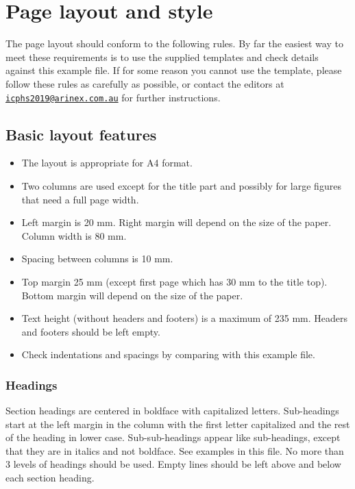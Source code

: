 \documentclass[a4paper,11pt,twocolumn]{article}
\begin{document}
\section{Page layout and style}

The page layout should conform to the following rules. By far the
easiest way to meet these requirements is to use the supplied templates
and check details against this example file. If for some reason you
cannot use the template, please follow these rules as carefully as
possible, or contact the editors at
\href{mailto:icphs2019@arinex.com.au}{\nolinkurl{icphs2019@arinex.com.au}}
for further instructions.

\subsection{Basic layout features}

\begin{itemize}
  \item The layout is appropriate for A4 format.
  \item Two columns are used except for the title part and possibly for large 
  figures that need a full page width.
  \item Left margin is 20 mm. Right margin will depend on the size of the 
  paper. Column width is 80 mm.
  \item Spacing between columns is 10 mm.
  \item Top margin 25 mm (except first page which has 30 mm to the title top). 
  Bottom margin will depend on the size of the paper.
  \item Text height (without headers and footers) is a maximum of 235 mm. 
  Headers and footers should be left empty.
  \item Check indentations and spacings by comparing with this example file.
\end{itemize}

\subsubsection{Headings}

Section headings are centered in boldface with capitalized letters.
Sub-headings start at the left margin in the column with the first
letter capitalized and the rest of the heading in lower case.
Sub-sub-headings appear like sub-headings, except that they are in
italics and not boldface. See examples in this file. No more than 3
levels of headings should be used. Empty lines should be left above and
below each section heading.
\end{document}

